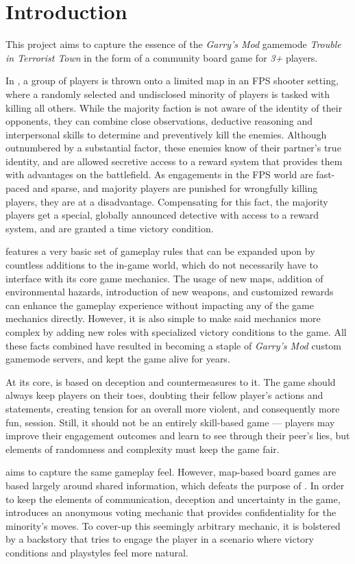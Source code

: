 \chapter{Introduction}

This project aims to capture the essence of the \emph{Garry's Mod} gamemode \emph{Trouble in Terrorist Town} in the form of a community board game for \emph{3+} players.

In \TTT{}, a group of players is thrown onto a limited map in an FPS shooter setting, where a randomly selected and undisclosed minority of players is tasked with killing all others.
While the majority faction is not aware of the identity of their opponents, they can combine close observations, deductive reasoning and interpersonal skills to determine and preventively kill the enemies.
Although outnumbered by a substantial factor, these enemies know of their partner's true identity, and are allowed secretive access to a reward system that provides them with advantages on the battlefield.
As engagements in the FPS world are fast-paced and sparse, and majority players are punished for wrongfully killing players, they are at a disadvantage.
Compensating for this fact, the majority players get a special, globally announced detective with access to a reward system, and are granted a time victory condition.

\TTT{} features a very basic set of gameplay rules that can be expanded upon by countless additions to the in-game world, which do not necessarily have to interface with its core game mechanics.
The usage of new maps, addition of environmental hazards, introduction of new weapons, and customized rewards can enhance the gameplay experience without impacting any of the game mechanics directly.
However, it is also simple to make said mechanics more complex by adding new roles with specialized victory conditions to the game.
All these facts combined have resulted in \TTT{} becoming a staple of \emph{Garry's Mod} custom gamemode servers, and kept the game alive for years.

At its core, \TTT{} is based on deception and countermeasures to it.
The game should always keep players on their toes, doubting their fellow player's actions and statements, creating tension for an overall more violent, and consequently more fun, session.
Still, it should not be an entirely skill-based game --- players may improve their engagement outcomes and learn to see through their peer's lies, but elements of randomness and complexity must keep the game fair.

\DDD{} aims to capture the same gameplay feel.
However, map-based board games are based largely around shared information, which defeats the purpose of \TTT{}.
In order to keep the elements of communication, deception and uncertainty in the game, \DDD{} introduces an anonymous voting mechanic that provides confidentiality for the minority's moves.
To cover-up this seemingly arbitrary mechanic, it is bolstered by a backstory that tries to engage the player in a scenario where victory conditions and playstyles feel more natural.